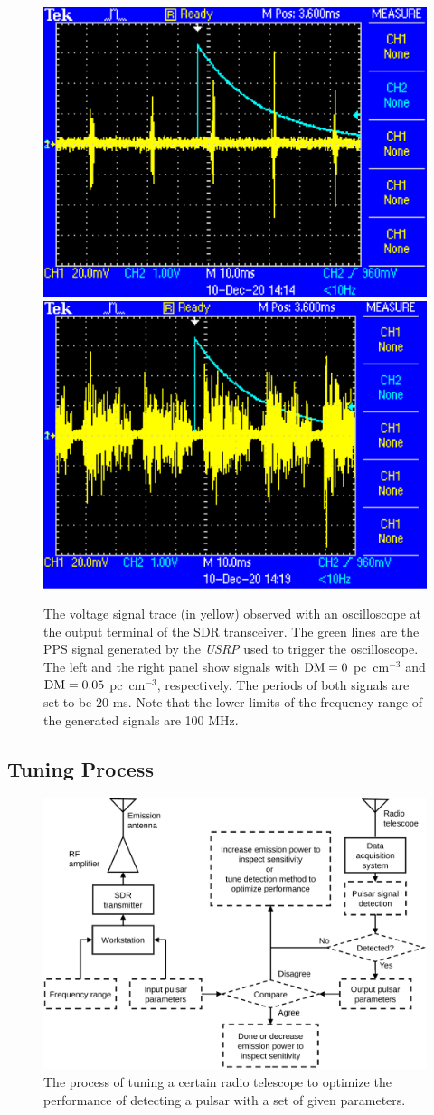 \documentclass[fleqn,usenatbib]{mnras}
\begin{document}
\begin{figure}
    \centering
    \includegraphics[width=0.45\columnwidth]{dm_0_trace.eps}
    \includegraphics[width=0.45\columnwidth]{dm_0.05_trace.eps}
    \caption{The voltage signal trace (in yellow) observed with an oscilloscope at the output terminal of the SDR transceiver. The green lines are the PPS signal generated by the \textit{USRP} used to trigger the oscilloscope. The left and the right panel show signals with ${\rm DM}=0$ pc~cm$^{-3}$ and ${\rm DM}=0.05$ pc~cm$^{-3}$, respectively. The periods of both signals are set to be $20$ ms. Note that the lower limits of the frequency range of the generated signals are 100 MHz.}
    \label{fig:osc_trace}
\end{figure}

\subsection{Tuning Process}
\begin{figure}
    \centering
    \includegraphics[width=\columnwidth]{tuning.pdf}
    \caption{The process of tuning a certain radio telescope to optimize the performance of detecting a pulsar with a set of given parameters.}
    \label{fig:tuning}
\end{figure}
\end{document}
